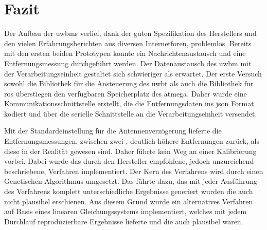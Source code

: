%
%
%		
%
\section{Fazit}

Der Aufbau der \glspl{uwbm} verlief, dank der guten Spezifikation des Herstellers und den vielen Erfahrungsberichten aus diversen Internetforen, problemlos. Bereits mit den ersten beiden Prototypen konnte ein Nachrichtenaustausch und eine Entfernungsmessung durchgeführt werden. Der Datenaustausch des \gls{uwbm} mit der Verarbeitungseinheit gestaltet sich schwieriger als erwartet. Der erste Versuch sowohl die Bibliothek für die Ansteuerung des \gls{uwbt} als auch die Bibliothek für \gls{ros} überstiegen den verfügbaren Speicherplatz des \gls{atmega}. Daher wurde eine Kommunikationsschnittstelle erstellt, die die Entfernungsdaten ins \gls{json} Format kodiert und über die serielle Schnittstelle an die Verarbeitungseinheit versendet.

Mit der Standardeinstellung für die Antennenverzögerung lieferte die Entfernungsmessungen, zwischen zwei , deutlich höhere Entfernungen zurück, als diese in der Realität gewesen sind. Daher führte kein Weg an einer Kalibrierung vorbei. Dabei wurde das durch den Hersteller empfohlene, jedoch unzureichend beschriebene, Verfahren implementiert. Der Kern des Verfahrens wird durch einen Genetischen Algorithmus umgesetzt. Das führte dazu, das mit jeder Ausführung des Verfahrens komplett unterschiedliche Ergebnisse generiert wurden die auch nicht plausibel erschienen. Aus diesem Grund wurde ein alternatives Verfahren auf Basis eines linearen Gleichungssystems implementiert, welches mit jedem Durchlauf reproduzierbare Ergebnisse lieferte und die auch plausibel waren.

